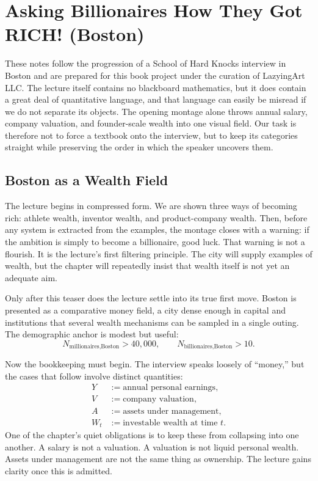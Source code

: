 \chapter{Asking Billionaires How They Got RICH! (Boston)}

These notes follow the progression of a School of Hard Knocks interview in Boston and are prepared for this book project under the curation of LazyingArt LLC. The lecture itself contains no blackboard mathematics, but it does contain a great deal of quantitative language, and that language can easily be misread if we do not separate its objects. The opening montage alone throws annual salary, company valuation, and founder-scale wealth into one visual field. Our task is therefore not to force a textbook onto the interview, but to keep its categories straight while preserving the order in which the speaker uncovers them.

\section{Boston as a Wealth Field}

The lecture begins in compressed form. We are shown three ways of becoming rich: athlete wealth, inventor wealth, and product-company wealth. Then, before any system is extracted from the examples, the montage closes with a warning: if the ambition is simply to become a billionaire, good luck. That warning is not a flourish. It is the lecture's first filtering principle. The city will supply examples of wealth, but the chapter will repeatedly insist that wealth itself is not yet an adequate aim.

Only after this teaser does the lecture settle into its true first move. Boston is presented as a comparative money field, a city dense enough in capital and institutions that several wealth mechanisms can be sampled in a single outing. The demographic anchor is modest but useful:
\begin{equation}
N_{\text{millionaires,Boston}} > 40{,}000,
\qquad
N_{\text{billionaires,Boston}} > 10.
\end{equation}

Now the bookkeeping must begin. The interview speaks loosely of ``money,'' but the cases that follow involve distinct quantities:
\begin{align}
Y &:= \text{annual personal earnings},\\
V &:= \text{company valuation},\\
A &:= \text{assets under management},\\
W_t &:= \text{investable wealth at time } t.
\end{align}
One of the chapter's quiet obligations is to keep these from collapsing into one another. A salary is not a valuation. A valuation is not liquid personal wealth. Assets under management are not the same thing as ownership. The lecture gains clarity once this is admitted.

